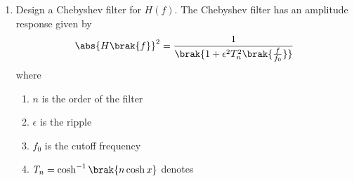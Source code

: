 \documentclass[journal,12pt,twocolumn]{IEEEtran}
\renewcommand\thesection{\arabic{section}}
\begin{document}
\begin{enumerate}[label=\thesection.\arabic*
,ref=\thesection.\theenumi]
Assumptions for the lowpass analog Butterworth filter:
\begin{enumerate}
	\item Passband edge, $f_p = 50$ Hz
	\item Stopband edge, $f_s = 100$ Hz
	\item Passband attenuation, $A_p = -1$ dB
	\item Stopband attenuation, $A_s = -20$ dB
\end{enumerate}
We are required to find a desriable order $n$ and cutoff
frequency $f_0$ for the filter. From \eqref{eq:loss},
\begin{align}
	A_p &= -10\log_{10}\sbrak{1 + \brak{\frac{f_p}{f_0}}^{2n}} \\
	A_s &= -10\log_{10}\sbrak{1 + \brak{\frac{f_s}{f_0}}^{2n}}
\end{align}
Thus,
\begin{align}
	\brak{\frac{f_p}{f_0}}^{2n} = 10^{-\frac{A_p}{10}} - 1 \label{eq:fc1} \\
	\brak{\frac{f_s}{f_0}}^{2n} = 10^{-\frac{A_s}{10}} - 1 \label{eq:fc2}
\end{align}
Therefore, on dividing the above equations and solving for $n$,
\begin{align}
	n = \frac{\log\brak{10^{-\frac{A_s}{10}} - 1} - 
		\log\brak{10^{-\frac{A_p}{10}} - 1}}{2\brak{\log{f_s} - \log{f_p}}}
\end{align}
In this case, making appropriate susbstitutions gives $n = 4.29$.
Hence, we take $n = 5$. Solving for $f_0$ in \eqref{eq:fc1} and
\eqref{eq:fc2},
\begin{align}
	f_{c1} = f_p\sbrak{10^{-\frac{A_p}{10}} - 1}^{-\frac{1}{2n}} = {57.23}{Hz} \\
	f_{c2} = f_s\sbrak{10^{-\frac{A_s}{10}} - 1}^{-\frac{1}{2n}} = {63.16}{Hz}
\end{align}
Hence, we take $f_0 = \sqrt{f_{c1}f_{c2}} = {60}{Hz}$ approximately.
\item Design a Chebyshev filter for $H(f)$.
\solution The Chebyshev filter has an amplitude response
given by
\begin{align}
	\abs{H\brak{f}}^2 = \frac{1}{\brak{1 + \epsilon^2T_n^2\brak{\frac{f}{f_0}}}}
\end{align}
where 
\begin{enumerate}
	\item $n$ is the order of the filter
	\item $\epsilon$ is the ripple
	\item $f_0$ is the cutoff frequency 
	\item $T_n = \cosh^{-1}\brak{n\cosh{x}}$ denotes 

\end{enumerate}
\end{enumerate}
\end{document}

